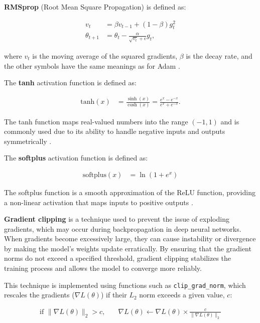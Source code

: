 \textbf{RMSprop} (Root Mean Square Propagation) is defined as:

\begin{align*}
v_t &= \beta v_{t-1} + (1 - \beta) g_t^2 \\
\theta_{t+1} &= \theta_t - \frac{\alpha}{\sqrt{v_t} + \epsilon} g_t,
\end{align*}

where \(v_t\) is the moving average of the squared gradients, \(\beta\) is the decay rate, and the other symbols have the same meanings as for Adam
\citep{hinton_lecture6a}.
\label{Def:RMSprop}


The \textbf{tanh} activation function is defined as:

\begin{align*}
\text{tanh}(x) &= \frac{\sinh(x)}{\cosh(x)} = \frac{e^x - e^{-x}}{e^x + e^{-x}}.
\end{align*}

The tanh function maps real-valued numbers into the range \((-1, 1)\) and is commonly used due to its ability to handle negative inputs and outputs symmetrically \citep{pytorch_tanh}.
\label{Def:tanh}

The \textbf{softplus} activation function is defined as:

\begin{align*}
\text{softplus}(x) &= \ln(1 + e^x)
\end{align*}

The softplus function is a smooth approximation of the ReLU function, providing a non-linear activation that maps inputs to positive outputs \citep{pytorch_softplus}.

\textbf{Gradient clipping} is a technique used to prevent the issue of exploding gradients, which may occur during backpropagation in deep neural networks. When gradients become excessively large, they can cause instability or divergence by making the model's weights update erratically. By ensuring that the gradient norms do not exceed a specified threshold, gradient clipping stabilizes the training process and allows the model to converge more reliably.

This technique is implemented using functions such as \texttt{clip\_grad\_norm}, which rescales the gradients (\(\nabla L(\theta)\)) if their \(L_2\) norm exceeds a given value, $c$:

\begin{align*}
\text{if } \|\nabla L(\theta)\|_2 > c, & \quad \nabla L(\theta) \leftarrow \nabla L(\theta) \times \frac{c}{\|\nabla L(\theta)\|_2}
\end{align*}

